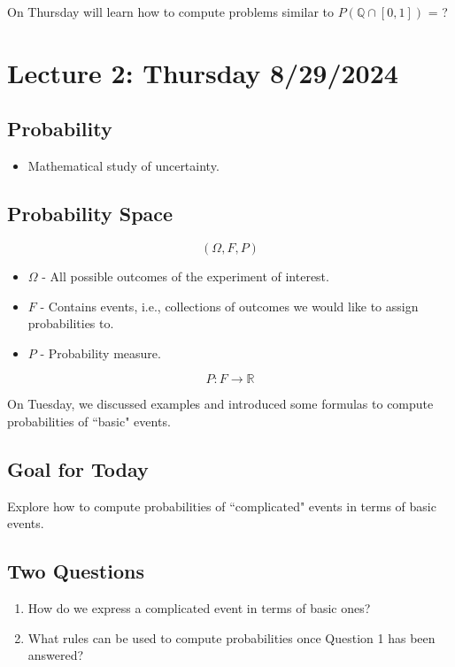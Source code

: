 \documentclass{article}
\begin{document}
On Thursday will learn how to compute problems similar to \(P(\mathbb{Q} \cap [0, 1])\) = ?


\pagebreak

\section*{Lecture 2: Thursday 8/29/2024}

\subsection*{Probability}

\begin{itemize}
    \item Mathematical study of uncertainty.
\end{itemize}

\subsection*{Probability Space}

\[
(\Omega, F, P)
\]

\begin{itemize}
    \item \(\Omega\) - All possible outcomes of the experiment of interest.
    \item \(F\) - Contains events, i.e., collections of outcomes we would like to assign probabilities to.
    \item \(P\) - Probability measure.
\end{itemize}

\[
P: F \rightarrow \mathbb{R}
\]

On Tuesday, we discussed examples and introduced some formulas to compute probabilities of ``basic" events.

\subsection*{Goal for Today}

Explore how to compute probabilities of ``complicated" events in terms of basic events.

\subsection*{Two Questions}

\begin{enumerate}
    \item How do we express a complicated event in terms of basic ones?
    \item What rules can be used to compute probabilities once Question 1 has been answered?
\end{enumerate}
\end{document}
